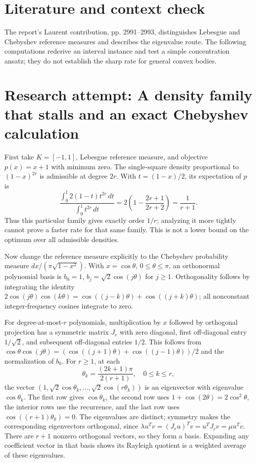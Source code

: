 \documentclass[11pt]{article}
\begin{document}
\section{Literature and context check}
The report's Laurent contribution, pp. 2991--2993, distinguishes Lebesgue and Chebyshev reference measures and describes the eigenvalue route. The following computations rederive an interval instance and test a simple concentration ansatz; they do not establish the sharp rate for general convex bodies.
\section{Research attempt: A density family that stalls and an exact Chebyshev calculation}
First take $K=[-1,1]$, Lebesgue reference measure, and objective $p(x)=x+1$ with minimum zero. The single-square density proportional to $(1-x)^{2r}$ is admissible at degree $2r$. With $t=(1-x)/2$, its expectation of $p$ is
\[
\frac{\int_0^1 2(1-t)t^{2r}\,dt}{\int_0^1t^{2r}\,dt}
=2\left(1-\frac{2r+1}{2r+2}\right)=\frac1{r+1}.
\]
Thus this particular family gives exactly order $1/r$; analyzing it more tightly cannot prove a faster rate for that same family. This is not a lower bound on the optimum over all admissible densities.

Now change the reference measure explicitly to the Chebyshev probability measure $dx/(\pi\sqrt{1-x^2})$. With $x=\cos\theta$, $0\le\theta\le\pi$, an orthonormal polynomial basis is $b_0=1$, $b_j=\sqrt2\cos(j\theta)$ for $j\ge1$. Orthogonality follows by integrating the identity $2\cos(j\theta)\cos(k\theta)=\cos((j-k)\theta)+\cos((j+k)\theta)$; all nonconstant integer-frequency cosines integrate to zero.

For degree-at-most-$r$ polynomials, multiplication by $x$ followed by orthogonal projection has a symmetric matrix $J_r$ with zero diagonal, first off-diagonal entry $1/\sqrt2$, and subsequent off-diagonal entries $1/2$. This follows from $\cos\theta\cos(j\theta)=(\cos((j+1)\theta)+\cos((j-1)\theta))/2$ and the normalization of $b_0$. For $r\ge1$, at each
\[
\theta_k=\frac{(2k+1)\pi}{2(r+1)},\quad 0\le k\le r,
\]
the vector $(1,\sqrt2\cos\theta_k,\ldots,\sqrt2\cos(r\theta_k))$ is an eigenvector with eigenvalue $\cos\theta_k$. The first row gives $\cos\theta_k$, the second row uses $1+\cos(2\theta)=2\cos^2\theta$, the interior rows use the recurrence, and the last row uses $\cos((r+1)\theta_k)=0$. The eigenvalues are distinct; symmetry makes the corresponding eigenvectors orthogonal, since $\lambda u^Tv=(J_ru)^Tv=u^TJ_rv=\mu u^Tv$. There are $r+1$ nonzero orthogonal vectors, so they form a basis. Expanding any coefficient vector in that basis shows its Rayleigh quotient is a weighted average of these eigenvalues.
\end{document}
